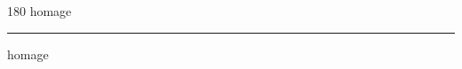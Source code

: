 
\begin{frame}
\begin{center}
\begin{turn}{180}
{\fontsize{2.5cm}{1em}\selectfont homage}
\end{turn}
\vspace{1em}\par  
\hrule
\vspace{1em}\par  
{\fontsize{2.5cm}{1em}\selectfont homage}
\end{center}
\end{frame}
